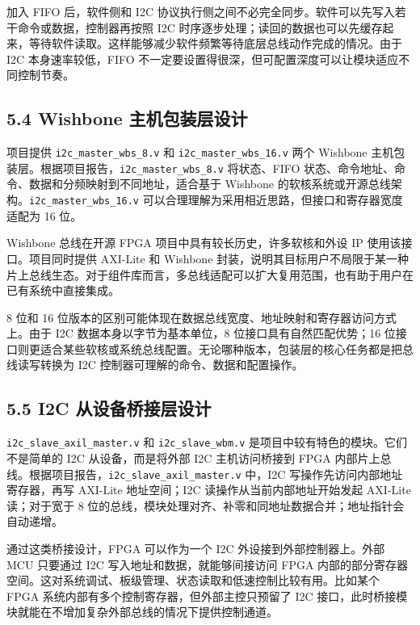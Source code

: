加入 FIFO 后，软件侧和 I2C 协议执行侧之间不必完全同步。软件可以先写入若干命令或数据，控制器再按照 I2C 时序逐步处理；读回的数据也可以先缓存起来，等待软件读取。这样能够减少软件频繁等待底层总线动作完成的情况。由于 I2C 本身速率较低，FIFO 不一定要设置得很深，但可配置深度可以让模块适应不同控制节奏。

\subsection{5.4 Wishbone 主机包装层设计}\label{wishbone-ux4e3bux673aux5305ux88c5ux5c42ux8bbeux8ba1}

项目提供 \texttt{i2c\_master\_wbs\_8.v} 和 \texttt{i2c\_master\_wbs\_16.v} 两个 Wishbone 主机包装层。根据项目报告，\texttt{i2c\_master\_wbs\_8.v} 将状态、FIFO 状态、命令地址、命令、数据和分频映射到不同地址，适合基于 Wishbone 的软核系统或开源总线架构。\texttt{i2c\_master\_wbs\_16.v} 可以合理理解为采用相近思路，但接口和寄存器宽度适配为 16 位。

Wishbone 总线在开源 FPGA 项目中具有较长历史，许多软核和外设 IP 使用该接口。项目同时提供 AXI-Lite 和 Wishbone 封装，说明其目标用户不局限于某一种片上总线生态。对于组件库而言，多总线适配可以扩大复用范围，也有助于用户在已有系统中直接集成。

8 位和 16 位版本的区别可能体现在数据总线宽度、地址映射和寄存器访问方式上。由于 I2C 数据本身以字节为基本单位，8 位接口具有自然匹配优势；16 位接口则更适合某些软核或系统总线配置。无论哪种版本，包装层的核心任务都是把总线读写转换为 I2C 控制器可理解的命令、数据和配置操作。

\subsection{5.5 I2C 从设备桥接层设计}\label{i2c-ux4eceux8bbeux5907ux6865ux63a5ux5c42ux8bbeux8ba1}

\texttt{i2c\_slave\_axil\_master.v} 和 \texttt{i2c\_slave\_wbm.v} 是项目中较有特色的模块。它们不是简单的 I2C 从设备，而是将外部 I2C 主机访问桥接到 FPGA 内部片上总线。根据项目报告，\texttt{i2c\_slave\_axil\_master.v} 中，I2C 写操作先访问内部地址寄存器，再写 AXI-Lite 地址空间；I2C 读操作从当前内部地址开始发起 AXI-Lite 读；对于宽于 8 位的总线，模块处理对齐、补零和同地址数据合并；地址指针会自动递增。

通过这类桥接设计，FPGA 可以作为一个 I2C 外设接到外部控制器上。外部 MCU 只要通过 I2C 写入地址和数据，就能够间接访问 FPGA 内部的部分寄存器空间。这对系统调试、板级管理、状态读取和低速控制比较有用。比如某个 FPGA 系统内部有多个控制寄存器，但外部主控只预留了 I2C 接口，此时桥接模块就能在不增加复杂外部总线的情况下提供控制通道。

